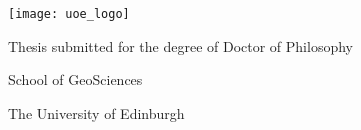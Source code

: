 \begin{titlepage}
\begin{center}

\begin{spacing}{2.5}
{\Huge\textsc{\textbf{\thesistitle{}}}}
\end{spacing}

\vspace{2.0cm}

\texttt{[image: uoe\_logo]}

\vspace{2.0cm}

{\LARGE \thesisauthor{}}

\vspace{2cm}

Thesis submitted for the degree of Doctor of Philosophy

School of GeoSciences

The University of Edinburgh

\thesisdate{}

\end{center}
\end{titlepage}

